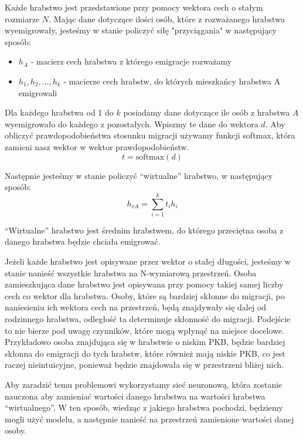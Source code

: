 \documentclass[a4paper,12pt]{article}
\newcommand{\softmax}{\mathrm{softmax}}
\begin{document}
Każde hrabstwo jest przedstawione przy pomocy wektora cech o stałym rozmiarze $N$. Mając dane dotyczące ilości osób, które z rozważanego hrabstwa wyemigrowały, jesteśmy w stanie policzyć siłę "przyciągania" w następujący sposób:
\begin{itemize}
    \item $h_A$ - macierz cech hrabstwa z którego emigracje rozważamy
    \item $h_1, h_2, \dots, h_k$ - macierze cech hrabstw, do których mieszkańcy hrabstwa A emigrowali
\end{itemize}
Dla każdego hrabstwa od 1 do $k$ posiadamy dane dotyczące ile osób z hrabstwa $A$ wyemigrowało do każdego z pozostałych. Wpiszmy te dane do wektora $d$. Aby obliczyć prawdopodobieństwa stosunku migracji używamy funkcji softmax, która zamieni nasz wektor w wektor prawdopodobieństw.
\begin{equation}
    t = \softmax(d)
\end{equation}

Następnie jesteśmy w stanie policzyć ``wirtualne'' hrabstwo, w następujący sposób:
\begin{equation}
    h_{vA} = \sum_{i=1}^{k} t_i h_i
\end{equation}

``Wirtualne'' hrabstwo jest średnim hrabstwem, do którego przeciętna osoba z danego hrabstwa będzie chciała emigrować.

Jeżeli każde hrabstwo jest opisywane przez wektor o stałej długości, jesteśmy w stanie nanieść wszystkie hrabstwa na N-wymiarową przestrzeń. Osoba zamieszkująca dane hrabstwo jest opisywana przy pomocy takiej samej liczby cech co wektor dla hrabstwa. Osoby, które są bardziej skłonne do migracji, po naniesieniu ich wektora cech na przestrzeń, będą znajdywały się dalej od rodzinnego hrabstwa, odległość ta determinuje skłonność do migracji. Podejście to nie bierze pod uwagę czynników, które mogą wpłynąć na miejsce docelowe. Przykładowo osoba znajdująca się w hrabstwie o niskim PKB, będzie bardziej skłonna do emigracji do tych hrabstw, które również mają niskie PKB, co jest raczej nieintuicyjne, ponieważ będzie znajdowała się w przestrzeni bliżej nich.

Aby zaradzić temu problemowi wykorzystamy sieć neuronową, która zostanie nauczona aby zamieniać wartości danego hrabstwa na wartości hrabstwa ``wirtualnego''. W ten sposób, wiedząc z jakiego hrabstwa pochodzi, będziemy mogli użyć modelu, a następnie nanieść na przestrzeń zamienione wartości danej osoby.
\end{document}
